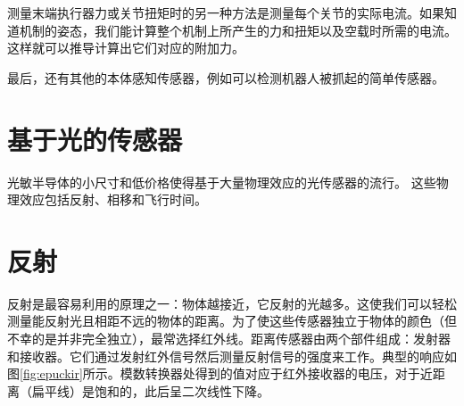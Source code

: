 测量末端执行器力或关节扭矩时的另一种方法是测量每个关节的实际电流。如果知道机制的姿态，我们能计算整个机制上所产生的力和扭矩以及空载时所需的电流。这样就可以推导计算出它们对应的附加力。


最后，还有其他的本体感知传感器，例如可以检测机器人被抓起的简单传感器。



\section{基于光的传感器}
光敏半导体的小尺寸和低价格使得基于大量物理效应的光传感器的流行。 这些物理效应包括反射、相移和飞行时间。


\section{反射}

反射是最容易利用的原理之一：物体越接近，它反射的光越多。这使我们可以轻松测量能反射光且相距不远的物体的距离。为了使这些传感器独立于物体的颜色（但不幸的是并非完全独立），最常选择红外线。距离传感器由两个部件组成：发射器和接收器。它们通过发射红外信号然后测量反射信号的强度来工作。典型的响应如图\ref{fig:epuckir}所示。模数转换器处得到的值对应于红外接收器的电压，对于近距离（扁平线）是饱和的，此后呈二次线性下降。

